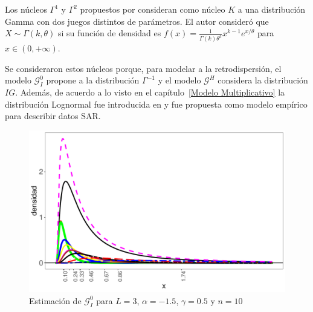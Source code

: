 Los núcleos $\Gamma^1$ y $\Gamma^2$ propuestos por \citet{chensx2000} consideran como núcleo $K$ a una distribución Gamma con dos juegos distintos de parámetros. El autor consideró que $X \sim \Gamma(k,\theta)$ si su función de densidad es $f(x)=\frac{1}{\Gamma(k) \theta^k} x^{k-1} e^{x/\theta}$ para $x \in (0,+\infty)$. 

Se consideraron estos núcleos porque, para modelar a la retrodispersión, el modelo $\mathcal{G}_I^0$ propone a la distribución $\Gamma^{-1}$ y el modelo $\mathcal{G}^H$ considera la distribución $IG$. Además, de acuerdo a lo visto en el capítulo~\ref{Modelo Multiplicativo} la distribución Lognormal fue introducida en \citet{oliverquegan98} y fue propuesta como modelo empírico para describir datos SAR.



\begin{figure}[hbt]
	\centering
	\includegraphics[scale=0.5]{../../Figures/Tesis/Capitulo5/EstimacionDensidadconLN.pdf}
	\caption{\label{EstimacionLN}Estimación de $\mathcal{G}_I^0$ para $L=3$, $\alpha=-1.5$, $\gamma=0.5$ y $n=10$}
\end{figure}

